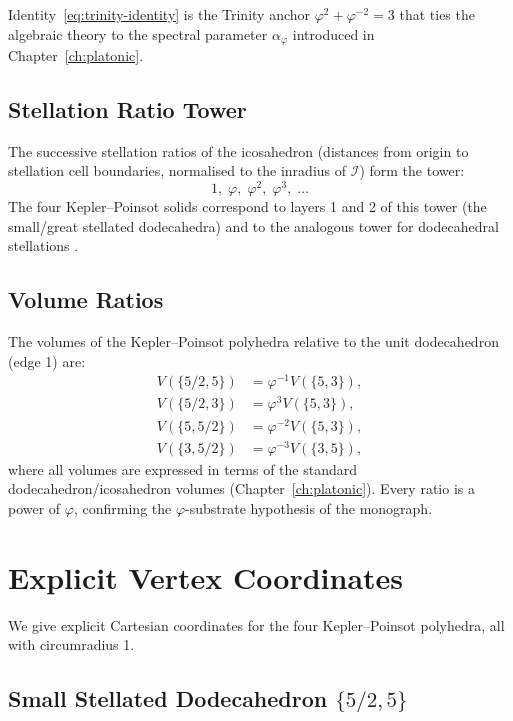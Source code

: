 Identity~\eqref{eq:trinity-identity} is the Trinity anchor
$\varphi^2 + \varphi^{-2} = 3$ that ties the algebraic theory
to the spectral parameter $\alpha_\varphi$ introduced in
Chapter~\ref{ch:platonic}.

\subsection{Stellation Ratio Tower}
\label{ssec:stellation-tower}

The successive stellation ratios of the icosahedron (distances
from origin to stellation cell boundaries, normalised to the
inradius of $\mathcal{I}$) form the tower:
\[
  1,\; \varphi,\; \varphi^2,\; \varphi^3,\; \ldots
\]
The four Kepler–Poinsot solids correspond to layers 1 and 2
of this tower (the small/great stellated dodecahedra) and to
the analogous tower for dodecahedral stellations
\cite{coxeter_fifty_nine_icosahedra}.

\subsection{Volume Ratios}
\label{ssec:volume-ratios}

The volumes of the Kepler–Poinsot polyhedra relative to the
unit dodecahedron (edge 1) are:
\begin{align*}
  V(\{5/2,5\}) &= \varphi^{-1} V(\{5,3\}),\\
  V(\{5/2,3\}) &= \varphi^3 V(\{5,3\}),\\
  V(\{5,5/2\}) &= \varphi^{-2} V(\{5,3\}),\\
  V(\{3,5/2\}) &= \varphi^{-3} V(\{3,5\}),
\end{align*}
where all volumes are expressed in terms of the standard
dodecahedron/icosahedron volumes (Chapter~\ref{ch:platonic}).
Every ratio is a power of $\varphi$, confirming the
$\varphi$-substrate hypothesis of the monograph.

\section{Explicit Vertex Coordinates}
\label{sec:coordinates}

We give explicit Cartesian coordinates for the four
Kepler–Poinsot polyhedra, all with circumradius 1.

\subsection{Small Stellated Dodecahedron \texorpdfstring{$\{5/2,5\}$}{5/2,5}}
\label{ssec:coords-ssd}

